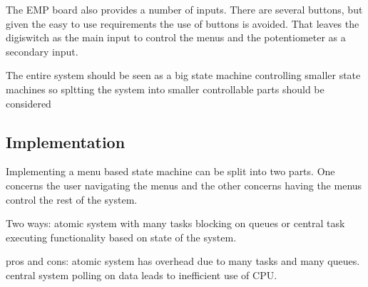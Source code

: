 The EMP board also provides a number of inputs. There are several buttons, but
given the easy to use requirements the use of buttons is avoided. That leaves
the digiswitch as the main input to control the menus and the potentiometer as a
secondary input.

The entire system should be seen as a big state machine controlling smaller
state machines so spltting the system into smaller controllable parts should be
considered

\subsection{Implementation}
Implementing a menu based state machine can be split into two parts. One
concerns the user navigating the menus and the other concerns having the menus
control the rest of the system.

Two ways: atomic system with many tasks blocking on queues or central task
executing functionality based on state of the system.

pros and cons: atomic system has overhead due to many tasks and many queues.
central system polling on data leads to inefficient use of CPU.
